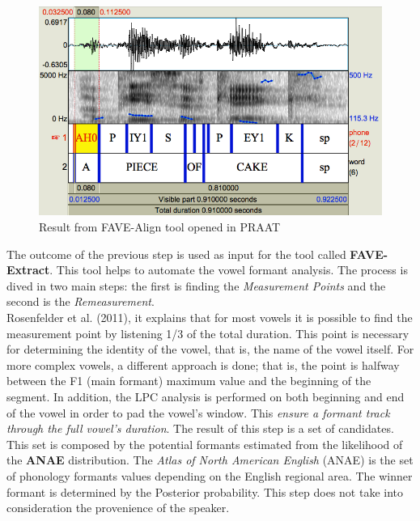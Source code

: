 \begin{figure}[!ht]
	\centering
	\includegraphics[scale=0.4]{Figures/fave_align.png}
	\caption{Result from FAVE-Align tool opened in PRAAT}
	\label{fig:fave-align_result}
\end{figure}

\noindent The outcome of the previous step is used as input for the tool called \textbf{FAVE-Extract}. This tool helps to automate the vowel formant analysis. The process is dived in two main steps: the first is finding the \textit{Measurement Points} and the second is the \textit{Remeasurement}. \\

\noindent Rosenfelder et al. (2011), it explains that for most vowels it is possible to find the measurement point by listening 1/3 of the total duration. This point is necessary for determining the identity of the vowel, that is, the name of the vowel itself. For more complex vowels, a different approach is done; that is, the point is halfway between the F1 (main formant) maximum value and the beginning of the segment. In addition, the LPC analysis is performed on both beginning and end of the vowel in order to pad the vowel's window. This \emph{ensure a formant track through the full vowel's duration}\cite{harrison2004variability}. The result of this step is a set of candidates. This set is composed by the potential formants estimated from the likelihood of the \textbf{ANAE} distribution. The \textit{Atlas of North American English} (ANAE) is the set of phonology formants values depending on the English regional area. The winner formant is determined by the Posterior probability. This step does not take into consideration the provenience of the speaker. \\

